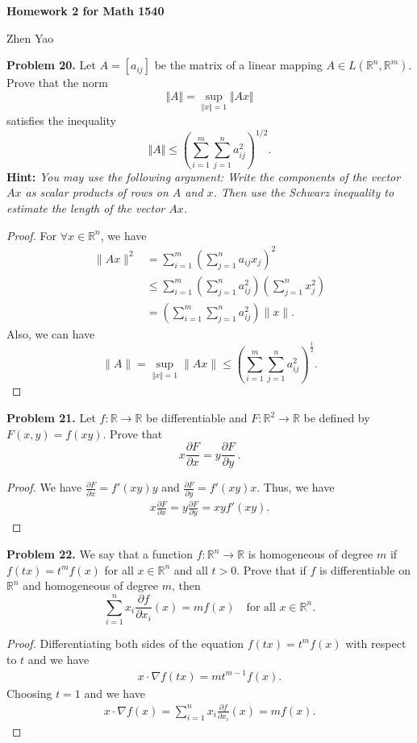\documentclass[12pt,leqno]{amsart}
\theoremstyle{definition}
\begin{document}
\centerline{\bf Homework 2 for Math 1540}
\centerline{Zhen Yao}

\bigskip





\noindent
{\bf Problem 20.}
Let $A=[a_{ij}]$ be the matrix of a linear mapping
$A\in L(\mathbb{R}^n,\mathbb{R}^m)$. Prove that the norm
$$
\Vert A\Vert=\sup_{\Vert x\Vert=1}\Vert Ax\Vert
$$
satisfies the inequality
$$
\Vert A\Vert \leq\left(\sum_{i=1}^m\sum_{j=1}^na_{ij}^2\right)^{1/2}.
$$
{\bf Hint:} {\em You may use the following argument: Write the components of
the vector $Ax$ as scalar products of rows on $A$ and $x$.
Then use the Schwarz inequality to estimate the length of the vector $Ax$.}
\begin{proof}
For $\forall x\in\mathbb{R}^n$, we have
\begin{align*}
    \|Ax\|^2 & = \sum^m_{i=1} \left(\sum^n_{j=1} a_{ij} x_j\right)^2 \\
    & \leq \sum^m_{i=1} \left(\sum^n_{j=1} a_{ij}^2 \right) \left(\sum^n_{j=1} x_{j}^2 \right) \\
    & = \left(\sum_{i=1}^m\sum_{j=1}^na_{ij}^2\right) \|x\|.
\end{align*}
Also, we can have
$$\|A\| = \sup_{\Vert x\Vert=1} \|Ax\| \leq \left(\sum_{i=1}^m\sum_{j=1}^na_{ij}^2\right)^{\frac{1}{2}}.$$
\end{proof}

\medskip

\noindent
{\bf Problem 21.}
Let $f:\mathbb{R}\to\mathbb{R}$ be differentiable and $F:\mathbb{R}^2\to\mathbb{R}$ be defined by
$F(x,y)=f(xy)$. Prove that
$$
x\frac{\partial F}{\partial x}=y\frac{\partial F}{\partial y}\, .
$$
\begin{proof}
We have $\frac{\partial F}{\partial x} = f'(xy)y$ and $\frac{\partial F}{\partial y} = f'(xy)x$. Thus, we have 
\begin{align*}
    x\frac{\partial F}{\partial x} = y\frac{\partial F}{\partial y} = xy f'(xy).
\end{align*}
\end{proof}

\medskip

\noindent
{\bf Problem 22.}
We say that a function $f:\mathbb{R}^n\to\mathbb{R}$ is homogeneous of degree $m$ if
$f(tx)=t^mf(x)$ for all $x\in\mathbb{R}^n$ and all $t>0$.
Prove that if $f$ is differentiable on $\mathbb{R}^n$ and homogeneous of
degree $m$, then
$$
\sum_{i=1}^n x_i\frac{\partial f}{\partial x_i}(x) = mf(x)
\quad
\mbox{for all $x\in\mathbb{R}^n$.}
$$
\begin{proof}
Differentiating both sides of the equation $f(tx)=t^mf(x)$ with respect to $t$ and we have
\begin{align*}
    x \cdot \nabla f(tx) = m t^{m-1} f(x).
\end{align*}
Choosing $t = 1$ and we have 
\begin{align*}
    x \cdot \nabla f(x) = \sum^n_{i=1} x_i \frac{\partial f}{\partial x_i}(x) = m f(x).
\end{align*}
\end{proof}
\end{document}
